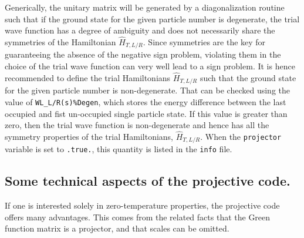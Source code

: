 Generically,   the  unitary matrix    will  be generated by a
diagonalization routine such that  if the ground state for the given particle number is degenerate, the trial wave function  has a degree of ambiguity  and does not necessarily share the symmetries of the Hamiltonian $\hat{H}_{T, L/R}$.   Since symmetries are the key for guaranteeing the absence of the negative sign problem, violating them in the choice of the trial wave function can very well lead to a  sign problem.   It is hence recommended to define the trial Hamiltonians $\hat{H}_{T, L/R}$ such that the ground state  for the given  particle number is non-degenerate. That can be checked using the value of \texttt{WL\_L/R(s)\%Degen}, which stores the energy difference between the last occupied and fist un-occupied single particle state. If this value is greater than zero, then the trial wave function is non-degenerate and hence has all the symmetry properties of the trial Hamiltonians, $\hat{H}_{T, L/R}$. When the \texttt{projector} variable is set to \texttt{.true.}, this quantity is listed in the \texttt{info} file. 

\subsection{Some technical aspects of the projective code.}
If one is interested solely in zero-temperature properties, the projective code offers many advantages.  This comes from the related facts that the Green function matrix is a projector, and that scales can be omitted. 
  
